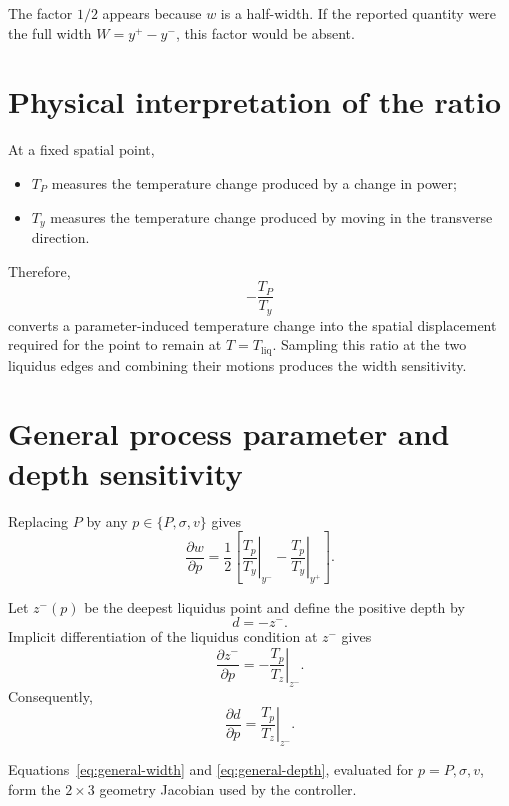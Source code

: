 \documentclass[11pt]{article}
\newcommand{\Tliq}{T_{\mathrm{liq}}}
\newcommand{\evalat}[2]{\left.#1\right|_{#2}}
\begin{document}
The factor $1/2$ appears because $w$ is a half-width.  If the reported
quantity were the full width $W=y^+-y^-$, this factor would be absent.

\section{Physical interpretation of the ratio}

At a fixed spatial point,
\begin{itemize}
  \item $T_P$ measures the temperature change produced by a change in power;
  \item $T_y$ measures the temperature change produced by moving in the
        transverse direction.
\end{itemize}
Therefore,
\begin{equation}
  -\frac{T_P}{T_y}
\end{equation}
converts a parameter-induced temperature change into the spatial displacement
required for the point to remain at $T=\Tliq$.  Sampling this ratio at the two
liquidus edges and combining their motions produces the width sensitivity.

\section{General process parameter and depth sensitivity}

Replacing $P$ by any $p\in\{P,\sigma,v\}$ gives
\begin{equation}
  \boxed{
  \frac{\partial w}{\partial p}
  =\frac{1}{2}
  \left[
    \evalat{\frac{T_p}{T_y}}{y^-}
    -\evalat{\frac{T_p}{T_y}}{y^+}
  \right].}
  \label{eq:general-width}
\end{equation}

Let $z^-(p)$ be the deepest liquidus point and define the positive depth by
\begin{equation}
  d=-z^-.
\end{equation}
Implicit differentiation of the liquidus condition at $z^-$ gives
\begin{equation}
  \frac{\partial z^-}{\partial p}
  =-\evalat{\frac{T_p}{T_z}}{z^-}.
\end{equation}
Consequently,
\begin{equation}
  \boxed{
  \frac{\partial d}{\partial p}
  =\evalat{\frac{T_p}{T_z}}{z^-}.}
  \label{eq:general-depth}
\end{equation}

Equations~\eqref{eq:general-width} and \eqref{eq:general-depth}, evaluated for
$p=P,\sigma,v$, form the $2\times3$ geometry Jacobian used by the controller.
\end{document}
